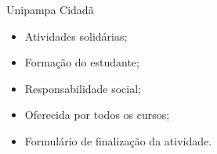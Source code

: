 \begin{frame}{{\sffamily Unipampa Cidadã}}
\begin{block}{}
    \begin{itemize}
        \item Atividades solidárias; %
        \item Formação do estudante; %
        \item Responsabilidade social; %
        \item Oferecida por todos os cursos; %
        \item Formulário de finalização da atividade.
    \end{itemize}
\end{block}
\end{frame}
